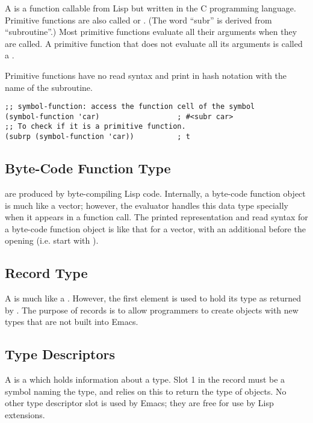 A  is a function callable from Lisp but written in the C programming language.
Primitive functions are also called  or .
(The word “subr” is derived from “subroutine”.)
Most primitive functions evaluate all their arguments when they are called.
A primitive function that does not evaluate all its arguments is called a .


Primitive functions have no read syntax and print in hash notation with the name of the subroutine.
\begin{lstlisting}
;; symbol-function: access the function cell of the symbol
(symbol-function 'car)                  ; #<subr car>
;; To check if it is a primitive function.
(subrp (symbol-function 'car))          ; t
\end{lstlisting}

\subsection{Byte-Code Function Type}
\label{sec:byte-code-function}

 are produced by byte-compiling Lisp code.
Internally, a byte-code function object is much like a vector; however, the evaluator handles this data type specially when it appears in a function call.
The printed representation and read syntax for a byte-code function object is like that for a vector, with an additional \argument{\#} before the opening \argument{[} (i.e. start with \argument{\#[}).


\subsection{Record Type}
\label{sec:record-type}

A  is much like a .
However, the first element is used to hold its type as returned by .
The purpose of records is to allow programmers to create objects with new types that are not built into Emacs.


\subsection{Type Descriptors}
\label{sec:type-descriptors}

A  is a  which holds information about a type.
Slot 1 in the record must be a symbol naming the type, and  relies on this to return the type of  objects.
No other type descriptor slot is used by Emacs; they are free for use by Lisp extensions.


